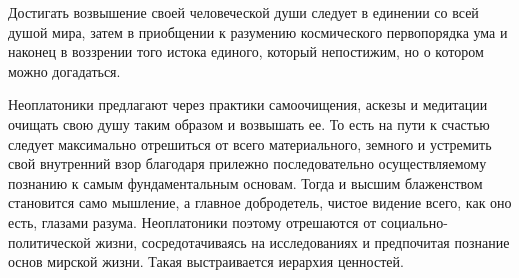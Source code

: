 Достигать возвышение своей человеческой души следует в единении со всей душой мира, затем в приобщении к разумению космического первопорядка ума и наконец в воззрении того истока единого, который непостижим, но о котором можно догадаться. 

Неоплатоники предлагают через практики самоочищения, аскезы и медитации очищать свою душу таким образом и возвышать ее. То есть на пути к счастью следует максимально отрешиться от всего материального, земного и устремить свой внутренний взор благодаря прилежно последовательно осуществляемому познанию к самым фундаментальным основам. 
Тогда и высшим блаженством становится само мышление, а главное добродетель, чистое видение всего, как оно есть, глазами разума. Неоплатоники поэтому отрешаются от социально-политической жизни, сосредотачиваясь на исследованиях и предпочитая познание основ мирской жизни. Такая выстраивается иерархия ценностей.

